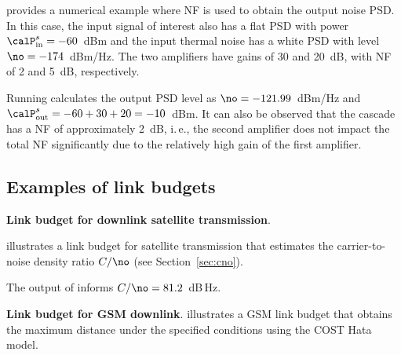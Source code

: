  provides a numerical example where NF is used to obtain the output noise PSD. 
In this case, the input signal of interest also has a flat PSD with power $\calP_{\textrm{in}}^{s}=-60$~dBm and the input thermal noise has a white PSD with level $\no=-174$~dBm/Hz. The two amplifiers have gains of 30 and 20~dB, with NF of 2 and 5~dB, respectively. 



Running  calculates the output PSD level as $\no=-121.99$~dBm/Hz and $\calP_{\textrm{out}}^{s}=-60+30+20=-10$~dBm. It can also be observed that 
the cascade has a NF of approximately 2~dB, i.\,e., the second amplifier does not impact the total NF significantly due to the relatively high gain of the first amplifier. 
\eExample


\subsection{Examples of link budgets}

\bExample \textbf{Link budget for downlink satellite transmission}.


 illustrates a link budget for satellite transmission
that estimates the carrier-to-noise density ratio $C/\no$ (see Section~\ref{sec:cno}).



The output of  informs $C/\no=81.2$~dB\,Hz.
\eExample 

\bExample \textbf{Link budget for GSM downlink}.
 illustrates a GSM link budget that obtains the
maximum distance under the specified conditions using the COST Hata model.

